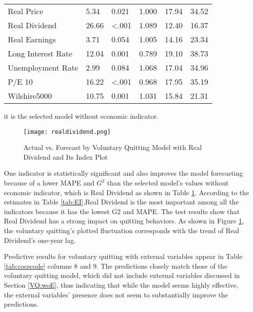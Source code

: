 \begin{table}[h!]
\begin{threeparttable}
\begin{tabular}{@{}llllll@{}}
			Real Price                & 5.34       & 0.021          & 1.000        & 17.94 & 34.52 \\
			Real Dividend             & 26.66      & \textless.001  & 1.089        & 12.40 & 16.37 \\
			Real Earnings             & 3.71       & 0.054          & 1.005        & 14.16 & 23.34 \\
			Long Interest Rate        & 12.04      & 0.001          & 0.789        & 19.10 & 38.73 \\
			Unemployment Rate         & 2.99       & 0.084          & 1.068        & 17.04 & 34.96 \\
			P/E 10                     & 16.22      & \textless.001  & 0.968        & 17.95 & 35.19 \\
			Wilshire5000              & 10.75      & 0.001          & 1.031        & 15.84 & 21.31 \\ \bottomrule
		\end{tabular}
		\begin{tablenotes}
			\item[1] it is the selected model without economic indicator.
		\end{tablenotes}
	\end{threeparttable}
	\label{tab:vqEI}%
\end{table}

\begin{figure}
	\centering
	\texttt{[image: realdividend.png]}
	\caption{Actual vs. Forecast by Voluntary Quitting Model with Real Dividend and Its Index Plot}
	\label{fig:vqrealdividend}
\end{figure}
One indicator is statistically significant and also improves the model forecasting because of a lower MAPE and $G^2$ than the selected model's values without economic indicator, which is Real Dividend as shown in Table \ref{tab:vqEI}. According to the estimates in Table \ref{tab:EI},Real Dividend is the most important among all the indicators because it has the lowest G2 and MAPE. The test results show that Real Dividend has a strong impact on quitting behaviors. As shown in Figure \ref{fig:vqrealdividend}, the voluntary quitting's plotted fluctuation corresponds with the trend of Real Dividend's one-year lag.

Predictive results for voluntary quitting with external variables appear in Table \ref{tab:cocscode} columns 8 and 9. The predictions closely match those of the voluntary quitting model, which did not include external variables discussed in Section \ref{VQ:woE}, thus indicating that while the model seems highly effective, the external variables' presence does not seem to substantially improve the predictions. 

